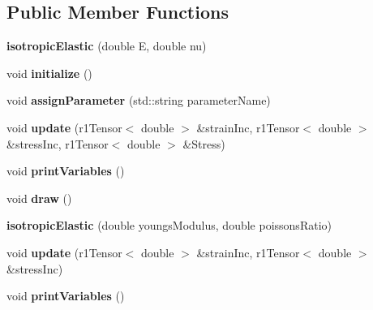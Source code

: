 \subsection*{Public Member Functions}
\begin{DoxyCompactItemize}
\item 
\mbox{\label{classisotropic_elastic_a2e05711ea5f4bc2e9b72ea431786846f}} 
{\bfseries isotropic\+Elastic} (double E, double nu)
\item 
\mbox{\label{classisotropic_elastic_a6b4509cefc87b30e2a42c224bd500045}} 
void {\bfseries initialize} ()
\item 
\mbox{\label{classisotropic_elastic_aabece1a0a47ebe56bcb74ec190087248}} 
void {\bfseries assign\+Parameter} (std\+::string parameter\+Name)
\item 
\mbox{\label{classisotropic_elastic_a2c940442cd89174075bd1e8a4ae3c37f}} 
void {\bfseries update} (r1\+Tensor$<$ double $>$ \&strain\+Inc, r1\+Tensor$<$ double $>$ \&stress\+Inc, r1\+Tensor$<$ double $>$ \&Stress)
\item 
\mbox{\label{classisotropic_elastic_aced4646179b73c77af191c6716ea32d0}} 
void {\bfseries print\+Variables} ()
\item 
\mbox{\label{classisotropic_elastic_a719c4f9f33246c00c7ba3c2af5563141}} 
void {\bfseries draw} ()
\item 
\mbox{\label{classisotropic_elastic_ab3b2f2897d0174e6b7feb44bbc498699}} 
{\bfseries isotropic\+Elastic} (double youngs\+Modulus, double poissons\+Ratio)
\item 
\mbox{\label{classisotropic_elastic_aa92c83e227328632cc01bf9223b95805}} 
void {\bfseries update} (r1\+Tensor$<$ double $>$ \&strain\+Inc, r1\+Tensor$<$ double $>$ \&stress\+Inc)
\item 
\mbox{\label{classisotropic_elastic_aced4646179b73c77af191c6716ea32d0}} 
void {\bfseries print\+Variables} ()
\item 
\mbox{\label{classisotropic_elastic_a6b4509cefc87b30e2a42c224bd500045}} 

\end{DoxyCompactItemize}
